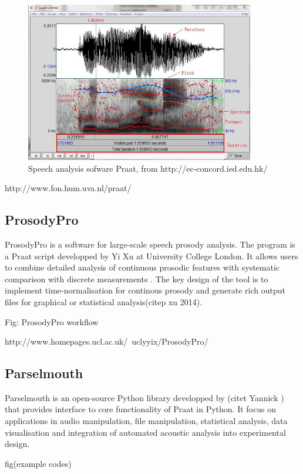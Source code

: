 \begin{figure}[ht]
	\center
	\includegraphics[width=10cm, scale=0.7]{figures/Praat.jpg}
	\caption{Speech analysis sofware Praat, from http://ec-concord.ied.edu.hk/}
	\label{fig:praat}
\end{figure}

http://www.fon.hum.uva.nl/praat/

\subsection{ProsodyPro}
ProsodyPro is a software for large-scale speech prosody analysis. The program is a Praat script developped by Yi Xu at University College London. It allows users to combine detailed analysis of continuous prosodic features with systematic comparison with discrete measurements . The key design of the tool is to implement time-normalisation for continous prosody and generate rich output files for graphical or statistical analysis(citep xu 2014).

Fig: ProsodyPro workflow

http://www.homepages.ucl.ac.uk/~uclyyix/ProsodyPro/

\subsection{Parselmouth}
Parselmouth is an open-source Python library developped by (citet Yannick ) that provides interface to core functionality of Praat in Python. It focus on applications in audio manipulation, file manipulation, statistical analysis, data visualisation and integration of automated acoustic analysis into experimental design.

fig(example codes)



